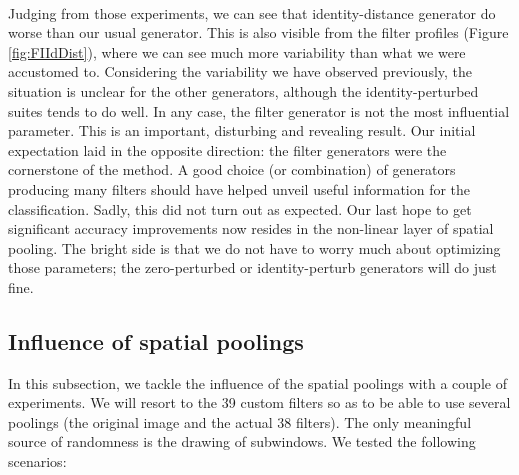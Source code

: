 \documentclass[a4paper]{report}
\begin{document}
	\paragraph{}
	Judging from those experiments, we can see that identity-distance generator do worse than our usual generator. This is also visible from the filter profiles (Figure \ref{fig:FIIdDist}), where we can see much more variability than what we were accustomed to.
	Considering the variability we have observed previously, the situation is unclear for the other generators, although the identity-perturbed suites tends to do well. In any case, the filter generator is not the most influential parameter. This is an important, disturbing and revealing result. Our initial expectation laid in the opposite direction: the filter generators were the cornerstone of the method. A good choice (or combination) of generators producing many filters should have helped unveil useful information for the classification. Sadly, this did not turn out as expected. Our last hope to get significant accuracy improvements now resides in the non-linear layer of spatial pooling.
	The bright side is that we do not have to worry much about optimizing those parameters; the zero-perturbed or identity-perturb generators will do just fine.
	
	
	\subsection{Influence of spatial poolings}
	In this subsection, we tackle the influence of the spatial poolings with a couple of experiments. We will resort to the 39 custom filters so as to be able to use several poolings (the original image and the actual 38 filters). The only meaningful source of randomness is the drawing of subwindows. We tested the following scenarios: 
	
\end{document}
